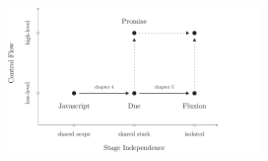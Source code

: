 \includegraphics[width=0.5\textwidth]{../ressources/roadmap.pdf}

\endinput

We show that there is no languages that features higher-order functions to improve modularity, a common memory store easy to develop with, but at the same time provides scalable concurrency.

We aim at filling this gap, and for a concrete example, focus our work on the Javascript programing language.
Indeed, Javascript features higher-order functions, is highly-used in concurrent context, but lacks scalable concurrency.

Our work is divided into two contributions: Due and Fluxions.

-> Schema roadmap.